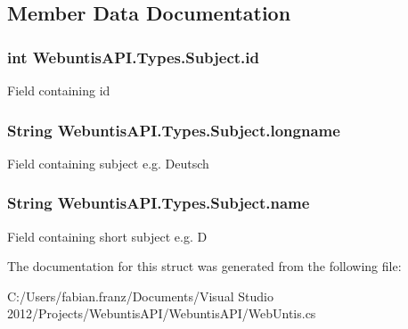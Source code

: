 \subsection{Member Data Documentation}
\hypertarget{struct_webuntis_a_p_i_1_1_types_1_1_subject_ae9e339f8fc82608d03dcd222fc03e81a}{
\subsubsection[{id}]{\setlength{\rightskip}{0pt plus 5cm}int Webuntis\-A\-P\-I.\-Types.\-Subject.\-id}}\label{struct_webuntis_a_p_i_1_1_types_1_1_subject_ae9e339f8fc82608d03dcd222fc03e81a}
Field containing id \hypertarget{struct_webuntis_a_p_i_1_1_types_1_1_subject_a07f2f0280c83cc595fcd18f8c291d9a0}{
\subsubsection[{longname}]{\setlength{\rightskip}{0pt plus 5cm}String Webuntis\-A\-P\-I.\-Types.\-Subject.\-longname}}\label{struct_webuntis_a_p_i_1_1_types_1_1_subject_a07f2f0280c83cc595fcd18f8c291d9a0}
Field containing subject e.\-g. Deutsch \hypertarget{struct_webuntis_a_p_i_1_1_types_1_1_subject_a52c74e223123db5b7add56d0a6ad0708}{
\subsubsection[{name}]{\setlength{\rightskip}{0pt plus 5cm}String Webuntis\-A\-P\-I.\-Types.\-Subject.\-name}}\label{struct_webuntis_a_p_i_1_1_types_1_1_subject_a52c74e223123db5b7add56d0a6ad0708}
Field containing short subject e.\-g. D 

The documentation for this struct was generated from the following file\-:\begin{DoxyCompactItemize}
\item 
C\-:/\-Users/fabian.\-franz/\-Documents/\-Visual Studio 2012/\-Projects/\-Webuntis\-A\-P\-I/\-Webuntis\-A\-P\-I/Web\-Untis.\-cs\end{DoxyCompactItemize}
